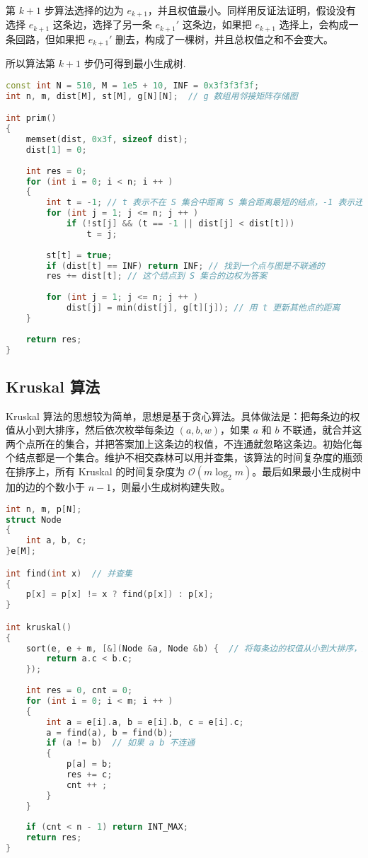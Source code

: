第 $k + 1$ 步算法选择的边为 $e_{k + 1}$，并且权值最小。同样用反证法证明，假设没有选择 $e_{k + 1}$ 这条边，选择了另一条 $e_{k + 1}'$ 这条边，如果把 $e_{k + 1}$ 选择上，会构成一条回路，但如果把 $e_{k + 1}'$ 删去，构成了一棵树，并且总权值之和不会变大。

所以算法第 $k+1$ 步仍可得到最小生成树. 

\begin{lstlisting}[language=cpp]
const int N = 510, M = 1e5 + 10, INF = 0x3f3f3f3f;
int n, m, dist[M], st[M], g[N][N];  // g 数组用邻接矩阵存储图

int prim()
{
    memset(dist, 0x3f, sizeof dist);
    dist[1] = 0;
    
    int res = 0;
    for (int i = 0; i < n; i ++ )
    {
        int t = -1; // t 表示不在 S 集合中距离 S 集合距离最短的结点，-1 表示还没找到
        for (int j = 1; j <= n; j ++ )
            if (!st[j] && (t == -1 || dist[j] < dist[t]))  
                t = j;  
        
        st[t] = true;
        if (dist[t] == INF) return INF; // 找到一个点与图是不联通的
        res += dist[t]; // 这个结点到 S 集合的边权为答案
        
        for (int j = 1; j <= n; j ++ )
            dist[j] = min(dist[j], g[t][j]); // 用 t 更新其他点的距离
    }
     
    return res;
}
\end{lstlisting}

\subsection{Kruskal 算法}

Kruskal 算法的思想较为简单，思想是基于贪心算法。具体做法是：把每条边的权值从小到大排序，然后依次枚举每条边 $(a,b,w)$，如果 $a$ 和 $b$ 不联通，就合并这两个点所在的集合，并把答案加上这条边的权值，不连通就忽略这条边。初始化每个结点都是一个集合。维护不相交森林可以用并查集，该算法的时间复杂度的瓶颈在排序上，所有 Kruskal 的时间复杂度为 $\mathcal{O}(m \log_2 m)$。最后如果最小生成树中加的边的个数小于 $n - 1$，则最小生成树构建失败。

\begin{lstlisting}[language=cpp]
int n, m, p[N];
struct Node
{
    int a, b, c;
}e[M];

int find(int x)  // 并查集
{
    p[x] = p[x] != x ? find(p[x]) : p[x];
}

int kruskal()
{
    sort(e, e + m, [&](Node &a, Node &b) {  // 将每条边的权值从小到大排序，这里使用了 Lambda
        return a.c < b.c;
    });
    
    int res = 0, cnt = 0;
    for (int i = 0; i < m; i ++ )
    {
        int a = e[i].a, b = e[i].b, c = e[i].c;
        a = find(a), b = find(b);
        if (a != b)  // 如果 a b 不连通
        {
            p[a] = b;
            res += c;
            cnt ++ ;
        }
    }
    
    if (cnt < n - 1) return INT_MAX;
    return res;
}


\end{lstlisting}